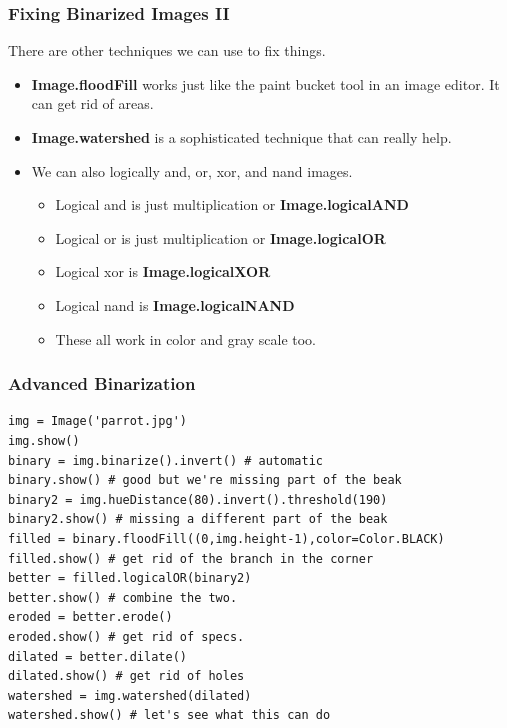 \documentclass{beamer}
\begin{document}
\begin{frame}
  \frametitle{Fixing Binarized Images II }

There are other techniques we can use to fix things. 
\begin{itemize}
\item \textbf{Image.floodFill} works just like the paint bucket tool
  in an image editor. It can get rid of areas.
\item \textbf{Image.watershed} is a sophisticated technique that can
  really help.
\item We can also logically and, or, xor, and nand images. 
  \begin{itemize}
  \item Logical and is just multiplication or \textbf{Image.logicalAND} 
  \item Logical or is just multiplication or \textbf{Image.logicalOR} 
  \item Logical xor is \textbf{Image.logicalXOR} 
  \item Logical nand is \textbf{Image.logicalNAND}
  \item These all work in color and gray scale too.
  \end{itemize}
\end{itemize}
\end{frame}
\begin{frame}[fragile] 
\frametitle{Advanced Binarization}
\begin{example}
\begin{verbatim}
img = Image('parrot.jpg')
img.show()
binary = img.binarize().invert() # automatic
binary.show() # good but we're missing part of the beak
binary2 = img.hueDistance(80).invert().threshold(190)
binary2.show() # missing a different part of the beak
filled = binary.floodFill((0,img.height-1),color=Color.BLACK)
filled.show() # get rid of the branch in the corner
better = filled.logicalOR(binary2)
better.show() # combine the two.
eroded = better.erode()
eroded.show() # get rid of specs.
dilated = better.dilate()
dilated.show() # get rid of holes
watershed = img.watershed(dilated)
watershed.show() # let's see what this can do
\end{verbatim}
\end{example}
\end{frame}

\end{document}
